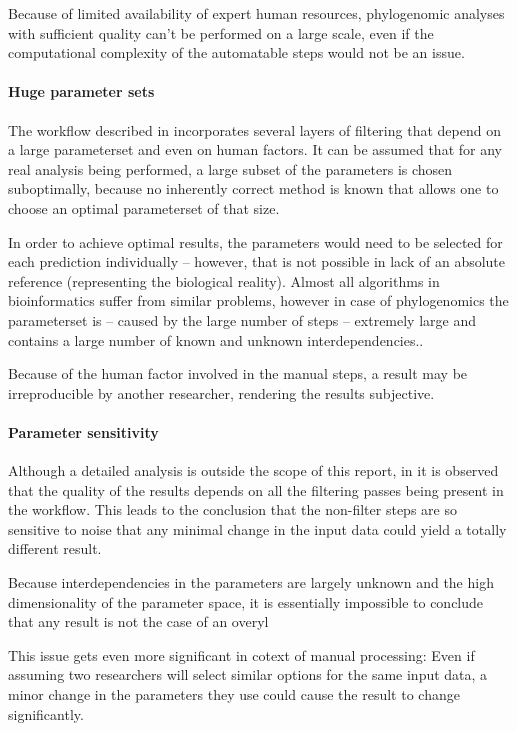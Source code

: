 \documentclass[pdftex,paper=A4,DIV=calc,titlepage,12pt]{scrartcl}
\newtheorem[L]{boxedDefinition}{Definition}
\begin{document}
Because of limited availability of expert human resources, phylogenomic analyses with sufficient quality can't be performed on a large scale, even if the computational complexity of the automatable steps would not be an issue.

\paragraph{Huge parameter sets}
The workflow described in \cite{sjolander2004phylogenomic} incorporates several layers of filtering that depend on a large parameterset and even on human factors. It can be assumed that for any real analysis being performed, a large subset of the parameters is chosen suboptimally, because no inherently correct method is known that allows one to choose an optimal parameterset of that size.

In order to achieve optimal results, the parameters would need to be selected for each prediction individually -- however, that is not possible in lack of an absolute reference (representing the biological reality). Almost all algorithms in bioinformatics suffer from similar problems, however in case of phylogenomics the parameterset is -- caused by the large number of steps -- extremely large and contains a large number of known and unknown interdependencies..

Because of the human factor involved in the manual steps, a result may be irreproducible by another researcher, rendering the results subjective.

\paragraph{Parameter sensitivity}
Although a detailed analysis is outside the scope of this report, in \cite{sjolander2004phylogenomic} it is observed that the quality of the results depends on all the filtering passes being present in the workflow. This leads to the conclusion that the non-filter steps are so sensitive to noise that any minimal change in the input data could yield a totally different result.

Because interdependencies in the parameters are largely unknown and the high dimensionality of the parameter space, it is essentially impossible to conclude that any result is not the case of an overyl

This issue gets even more significant in cotext of manual processing: Even if assuming two researchers will select similar options for the same input data, a minor change in the parameters they use could cause the result to change significantly.
\end{document}
